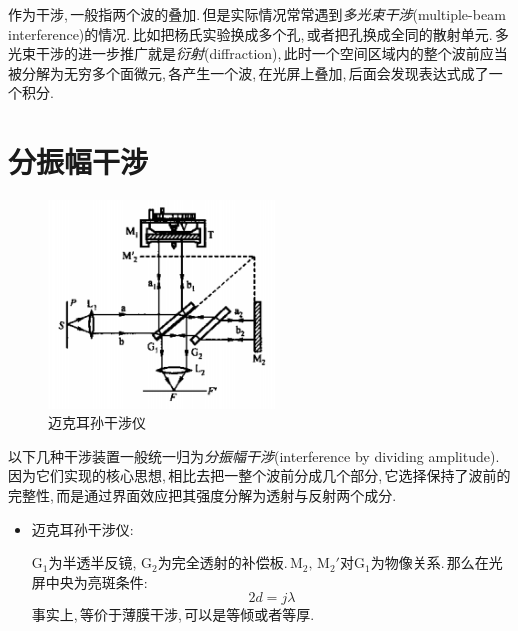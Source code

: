 作为干涉,\,一般指两个波的叠加.\,但是实际情况常常遇到\emph{多光束干涉}(multiple-beam interference)的情况.\,比如把杨氏实验换成多个孔,\,或者把孔换成全同的散射单元.\,多光束干涉的进一步推广就是\emph{衍射}(diffraction),\,此时一个空间区域内的整个波前应当被分解为无穷多个面微元,\,各产生一个波,\,在光屏上叠加,\,后面会发现表达式成了一个积分.




\section{分振幅干涉}

\begin{figure}
\centering
\vspace{0.1cm}
\includegraphics[width=6cm]{image/14-1-4.png}
\caption{迈克耳孙干涉仪}
\end{figure}
以下几种干涉装置一般统一归为\emph{分振幅干涉}(interference by dividing amplitude).\,因为它们实现的核心思想,\,相比去把一整个波前分成几个部分,\,它选择保持了波前的完整性,\,而是通过界面效应把其强度分解为透射与反射两个成分.

\begin{itemize}


\item 迈克耳孙干涉仪:

$\mathrm{G}_1$为半透半反镜, $\mathrm{G}_2$为完全透射的补偿板.\,$\mathrm{M}_2,\,\mathrm{M}_2'$对$\mathrm{G}_1$为物像关系.\,那么在光屏中央为亮斑条件:
\[2d=j\lambda\]
事实上,\,等价于薄膜干涉,\,可以是等倾或者等厚.
\end{itemize}

